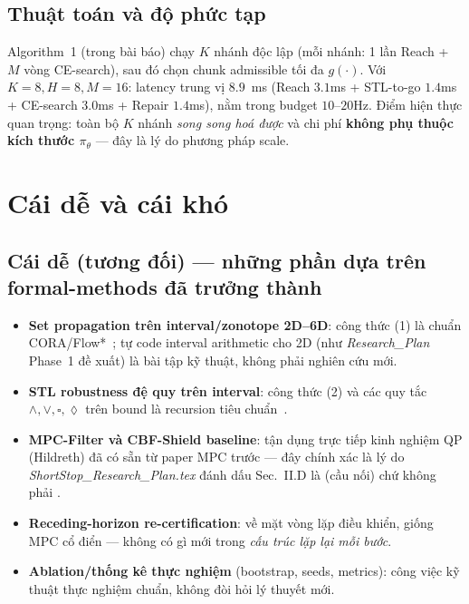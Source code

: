\documentclass[a4paper,12pt]{article}
\let\stdsection\section
\renewcommand{\section}{\clearpage\stdsection}
\begin{document}
\subsection{Thuật toán và độ phức tạp}
Algorithm~1 (trong bài báo) chạy $K$ nhánh độc lập (mỗi nhánh: 1 lần Reach + $M$ vòng CE-search), sau đó chọn chunk admissible tối đa $g(\cdot)$. Với $K=8,H=8,M=16$: latency trung vị $8.9$~ms (Reach $3.1$ms + STL-to-go $1.4$ms + CE-search $3.0$ms + Repair $1.4$ms), nằm trong budget $10$--$20$Hz. Điểm hiện thực quan trọng: toàn bộ $K$ nhánh \emph{song song hoá được} và chi phí \textbf{không phụ thuộc kích thước $\pi_\theta$} --- đây là lý do phương pháp scale.

\section{Cái dễ và cái khó}\label{sec:hard-easy}
\subsection{Cái dễ (tương đối) --- những phần dựa trên formal-methods đã trưởng thành}
\begin{itemize}
  \item \textbf{Set propagation trên interval/zonotope 2D--6D}: công thức (1) là chuẩn CORA/Flow*~\cite{althoff2015cora,chen2013flowstar}; tự code interval arithmetic cho 2D (như \emph{Research\_Plan} Phase~1 đề xuất) là bài tập kỹ thuật, không phải nghiên cứu mới.
  \item \textbf{STL robustness đệ quy trên interval}: công thức (2) và các quy tắc $\wedge,\vee,\square,\lozenge$ trên bound là recursion tiêu chuẩn~\cite{deshmukh2017robust,fainekos2009robustness}.
  \item \textbf{MPC-Filter và CBF-Shield baseline}: tận dụng trực tiếp kinh nghiệm QP (Hildreth) đã có sẵn từ paper MPC trước --- đây chính xác là lý do \emph{ShortStop\_Research\_Plan.tex} đánh dấu Sec.~II.D là \bridge{} (cầu nối) chứ không phải \new{}.
  \item \textbf{Receding-horizon re-certification}: về mặt vòng lặp điều khiển, giống MPC cổ điển --- không có gì mới trong \emph{cấu trúc lặp lại mỗi bước}.
  \item \textbf{Ablation/thống kê thực nghiệm} (bootstrap, seeds, metrics): công việc kỹ thuật thực nghiệm chuẩn, không đòi hỏi lý thuyết mới.
\end{itemize}
\end{document}
